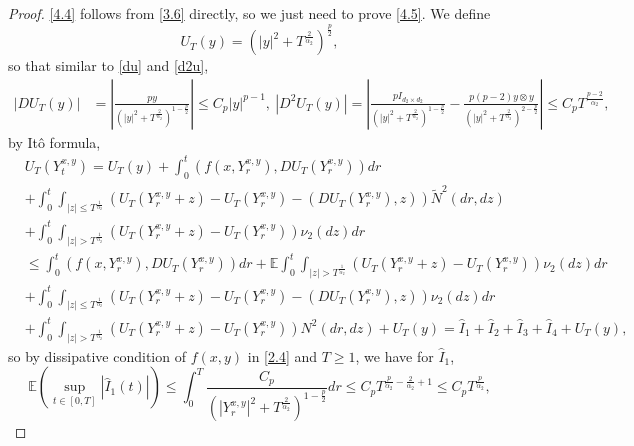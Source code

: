 \documentclass[10pt,a4paper]{amsart}
\begin{document}
\begin{proof}
	\eqref{4.4} follows from \eqref{3.6} directly, so we just need to prove \eqref{4.5}.
	We define 
	\begin{equation}\label{4.6}
		U_{T}(y)=(|y|^{2}+T^{\frac{2}{\alpha_{2}}})^{\frac{p}{2}},
	\end{equation}
	so that similar to \eqref{du} and \eqref{d2u},
	\begin{equation}\label{4.7}
		\begin{split}
				|DU_{T}(y)|&=\left|  \frac{py}{(|y|^{2}+T^{\frac{2}{\alpha_{2}}})^{1-\frac{p}{2}}}\right|\leq C_{p} |y|^{p-1},\
		|D^{2}U_{T}(y)|=\left|   \frac{pI_{d_{2}\times d_{2} }}{(|y|^{2}+T^{\frac{2}{\alpha_{2}}})^{1-\frac{p}{2}}}-\frac{p(p-2)y\otimes y}{(|y|^{2}+T^{\frac{2}{\alpha_{2}}})^{2-\frac{p}{2}}} \right|\leq C_{p}T^{\frac{p-2}{\alpha_{2}}},
		\end{split}
	\end{equation}
by It\^{o} formula,
	\begin{equation}\label{4.8}
		\begin{split}
			&U_{T}(Y_{t}^{ x,y})=U_{T}(y)+ \int_{0}^{t} (f(x,Y_{r}^{ x,y}),DU_{T}(Y_{r}^{x,y})) dr \\
			&+ \int_{0}^{t}\int_{|z|\leq T^{\frac{1}{\alpha_{2}}}}\left( U_{T}(Y_{r}^{ x,y}+z)-U_{T}(Y_{r}^{ x,y})-(DU_{T}(Y_{r}^{ x,y}), z)  \right) \tilde{N}^{2}(dr,dz)\\
			&+\int_{0}^{t} \int_{|z|> T^{\frac{1}{\alpha_{2}}}}\left( U_{T}(Y_{r}^{x,y}+z)-U_{T}(Y_{r}^{ x,y}) \right) \nu_{2}(dz)dr\\
			&\leq  \int_{0}^{t} (f(x,Y_{r}^{x,y}),DU_{T}(Y_{r}^{ x,y})) dr+\mathbb{E} \int_{0}^{t}\int_{|z|> T^{\frac{1}{\alpha_{2}}}}\left( U_{T}(Y_{r}^{x,y}+z)-U_{T}(Y_{r}^{ x,y}) \right) \nu_{2}(dz)dr\\
			&+\int_{0}^{t} \int_{|z|\leq T^{\frac{1}{\alpha_{2}}}}\left( U_{T}(Y_{r}^{x,y}+z)-U_{T}(Y_{r}^{ x,y})- (DU_{T}(Y_{r}^{x,y}), z)\right) \nu_{2}(dz)dr\\
			&+\int_{0}^{t} \int_{|z|> T^{\frac{1}{\alpha_{2}}}}\left( U_{T}(Y_{r}^{x,y}+z)-U_{T}(Y_{r}^{ x,y}) \right) N^{2}(dr,dz)+U_{T}(y)=\hat{I}_{1}+\hat{I}_{2}+\hat{I}_{3}+\hat{I}_{4}+U_{T}(y),
		\end{split}
	\end{equation}
	so by dissipative condition of $f(x,y)$ in  \eqref{2.4} and $T\geq 1$, we have for $\hat{I}_{1}$,
	\begin{equation}\label{4.9}
		\mathbb{E}\left(\sup_{t\in [0,T]} |\hat{I}_{1}(t)|\right)\leq \int_{0}^{T} \frac{C_{p}}{(|Y_{r}^{ x,y}|^{2}+T^{\frac{2}{\alpha_{2}}})^{1-\frac{p}{2}}}dr\leq C_{p}T^{\frac{p}{\alpha_{2}}-\frac{2}{\alpha_{2}}+1}\leq C_{p}T^{\frac{p}{\alpha_{2}}},

\end{equation}
\end{proof}
\end{document}
